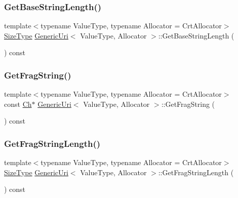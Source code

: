 \mbox{\label{classGenericUri_a87075603b398cc925d04180343443aca}} 
\subsubsection{\texorpdfstring{Get\+Base\+String\+Length()}{GetBaseStringLength()}}
{\footnotesize\ttfamily template$<$typename Value\+Type, typename Allocator = Crt\+Allocator$>$ \\
\hyperlink{rapidjson_8h_a5ed6e6e67250fadbd041127e6386dcb5}{Size\+Type} \hyperlink{classGenericUri}{Generic\+Uri}$<$ Value\+Type, Allocator $>$\+::Get\+Base\+String\+Length (\begin{DoxyParamCaption}{ }\end{DoxyParamCaption}) const\hspace{0.3cm}{\ttfamily [inline]}}

\mbox{\label{classGenericUri_a03ad0639273683a6f0141156e68d02ab}} 
\subsubsection{\texorpdfstring{Get\+Frag\+String()}{GetFragString()}}
{\footnotesize\ttfamily template$<$typename Value\+Type, typename Allocator = Crt\+Allocator$>$ \\
const \hyperlink{classGenericUri_a20d0602cff62211d89bc4b25963beeee}{Ch}$\ast$ \hyperlink{classGenericUri}{Generic\+Uri}$<$ Value\+Type, Allocator $>$\+::Get\+Frag\+String (\begin{DoxyParamCaption}{ }\end{DoxyParamCaption}) const\hspace{0.3cm}{\ttfamily [inline]}}

\mbox{\label{classGenericUri_a808ac934c8cb8aaf57f63b216a40a9b9}} 
\subsubsection{\texorpdfstring{Get\+Frag\+String\+Length()}{GetFragStringLength()}}
{\footnotesize\ttfamily template$<$typename Value\+Type, typename Allocator = Crt\+Allocator$>$ \\
\hyperlink{rapidjson_8h_a5ed6e6e67250fadbd041127e6386dcb5}{Size\+Type} \hyperlink{classGenericUri}{Generic\+Uri}$<$ Value\+Type, Allocator $>$\+::Get\+Frag\+String\+Length (\begin{DoxyParamCaption}{ }\end{DoxyParamCaption}) const\hspace{0.3cm}{\ttfamily [inline]}}

